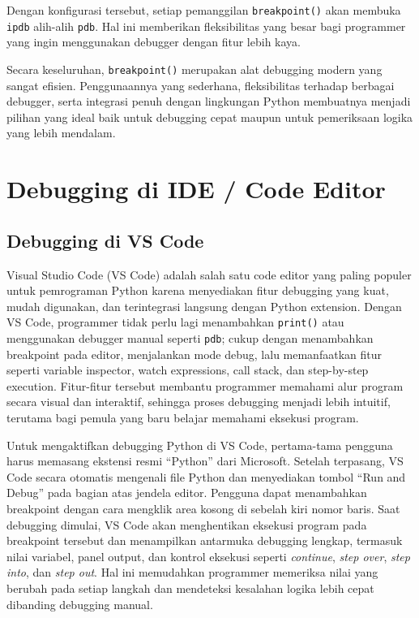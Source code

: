 Dengan konfigurasi tersebut, setiap pemanggilan \texttt{breakpoint()} akan membuka \texttt{ipdb} alih-alih \texttt{pdb}. Hal ini memberikan fleksibilitas yang besar bagi programmer yang ingin menggunakan debugger dengan fitur lebih kaya.

Secara keseluruhan, \texttt{breakpoint()} merupakan alat debugging modern yang sangat efisien. Penggunaannya yang sederhana, fleksibilitas terhadap berbagai debugger, serta integrasi penuh dengan lingkungan Python membuatnya menjadi pilihan yang ideal baik untuk debugging cepat maupun untuk pemeriksaan logika yang lebih mendalam.


\section{Debugging di IDE / Code Editor}

\subsection{Debugging di VS Code}

Visual Studio Code (VS Code) adalah salah satu code editor yang paling populer untuk pemrograman Python karena menyediakan fitur debugging yang kuat, mudah digunakan, dan terintegrasi langsung dengan Python extension. Dengan VS Code, programmer tidak perlu lagi menambahkan \texttt{print()} atau menggunakan debugger manual seperti \texttt{pdb}; cukup dengan menambahkan breakpoint pada editor, menjalankan mode debug, lalu memanfaatkan fitur seperti variable inspector, watch expressions, call stack, dan step-by-step execution. Fitur-fitur tersebut membantu programmer memahami alur program secara visual dan interaktif, sehingga proses debugging menjadi lebih intuitif, terutama bagi pemula yang baru belajar memahami eksekusi program.

Untuk mengaktifkan debugging Python di VS Code, pertama-tama pengguna harus memasang ekstensi resmi “Python” dari Microsoft. Setelah terpasang, VS Code secara otomatis mengenali file Python dan menyediakan tombol “Run and Debug” pada bagian atas jendela editor. Pengguna dapat menambahkan breakpoint dengan cara mengklik area kosong di sebelah kiri nomor baris. Saat debugging dimulai, VS Code akan menghentikan eksekusi program pada breakpoint tersebut dan menampilkan antarmuka debugging lengkap, termasuk nilai variabel, panel output, dan kontrol eksekusi seperti \textit{continue}, \textit{step over}, \textit{step into}, dan \textit{step out}. Hal ini memudahkan programmer memeriksa nilai yang berubah pada setiap langkah dan mendeteksi kesalahan logika lebih cepat dibanding debugging manual.

